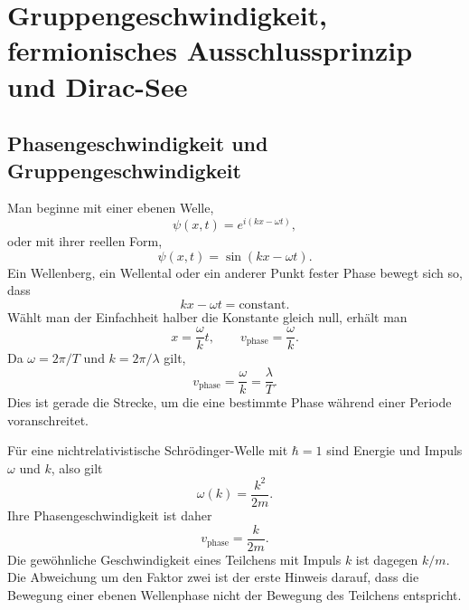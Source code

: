 \chapter{Gruppengeschwindigkeit, fermionisches Ausschlussprinzip und Dirac-See}

\section{Phasengeschwindigkeit und Gruppengeschwindigkeit}

\begin{classroomqa}
\end{classroomqa}

Man beginne mit einer ebenen Welle,
\begin{equation}
\psi(x,t)=e^{i(kx-\omega t)},
\end{equation}
oder mit ihrer reellen Form,
\begin{equation}
\psi(x,t)=\sin(kx-\omega t).
\end{equation}
Ein Wellenberg, ein Wellental oder ein anderer Punkt fester Phase bewegt sich so, dass
\begin{equation}
kx-\omega t=\text{constant}.
\end{equation}
Wählt man der Einfachheit halber die Konstante gleich null, erhält man
\begin{equation}
x=\frac{\omega}{k}t,
\qquad
v_{\mathrm{phase}}=\frac{\omega}{k}.
\end{equation}
Da \(\omega=2\pi/T\) und \(k=2\pi/\lambda\) gilt,
\begin{equation}
v_{\mathrm{phase}}=\frac{\omega}{k}=\frac{\lambda}{T}.
\end{equation}
Dies ist gerade die Strecke, um die eine bestimmte Phase während einer Periode voranschreitet.

Für eine nichtrelativistische Schr\"odinger-Welle mit \(\hbar=1\) sind Energie und Impuls \(\omega\) und \(k\), also gilt
\begin{equation}
\omega(k)=\frac{k^2}{2m}.
\end{equation}
Ihre Phasengeschwindigkeit ist daher
\begin{equation}
v_{\mathrm{phase}}=\frac{k}{2m}.
\end{equation}
Die gewöhnliche Geschwindigkeit eines Teilchens mit Impuls \(k\) ist dagegen \(k/m\). Die Abweichung um den Faktor zwei ist der erste Hinweis darauf, dass die Bewegung einer ebenen Wellenphase nicht der Bewegung des Teilchens entspricht.

